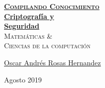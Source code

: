\documentclass[12pt, fleqn]{report}                             %
\author{Oscar Andrés Rosas}                                     %
\theoremstyle{break}                                            %
\begin{document}
\begin{titlepage}
    
    \pagecolor{TitlePageColor}                                      %
    \color{white}                                                   %

    \vspace                                                         %
    \baselineskip                                                   %

    \makebox[0pt][l]{\rule{1.3\textwidth}{3pt}}                     %
    
    \href{https://compilandoconocimiento.com}                       %
    {\textbf{\textsc{\Huge Compilando Conocimiento}}}\\[2.7cm]      %

    \href{\ProjectNameLink}                                         %
    {\fontsize{45}{58}\selectfont \textbf{Criptografía y \\Seguridad}}\\[0.5cm] %
    \textcolor{ColorSubtext}{\textsc{\Huge Matemáticas \& \\ Ciencias de la computación}}            %
    
    \vfill                                                          %
    
    \href{\ProjectAuthorLink}                                       %
    {\LARGE \textsf{Oscar Andrés Rosas Hernandez}}                  %

    \vspace                                                         %
    \baselineskip                                                   %
    
    {\large \textsf{Agosto 2019}}                                   %
\end{titlepage}
\end{document}

